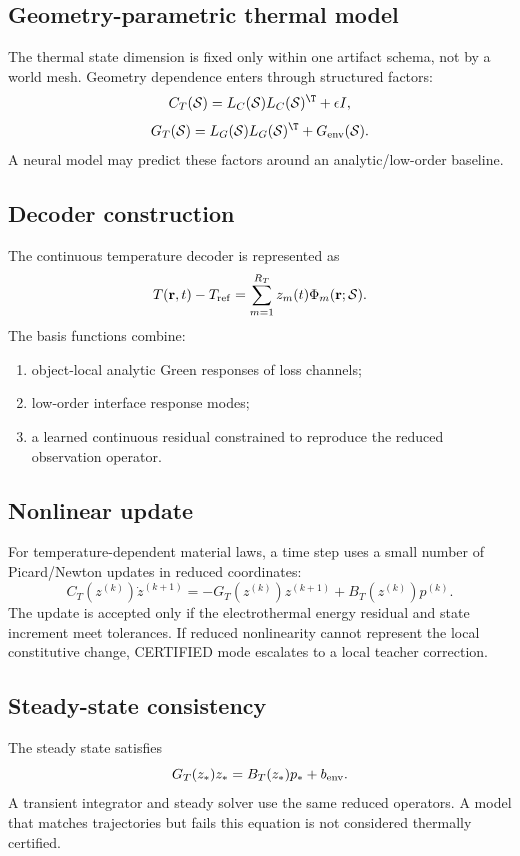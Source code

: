 \subsection{Geometry-parametric thermal model}

The thermal state dimension is fixed only within one artifact schema, not by a
world mesh. Geometry dependence enters through structured factors:
\[
 C_T(\mathcal S)=L_C(\mathcal S)L_C(\mathcal S)^\T+\epsilon I,
\]
\[
 G_T(\mathcal S)=L_G(\mathcal S)L_G(\mathcal S)^\T+G_{\rm env}(\mathcal S).
\]
A neural model may predict these factors around an analytic/low-order baseline.

\subsection{Decoder construction}

The continuous temperature decoder is represented as
\[
 T(\mathbf r,t)-T_{\rm ref}
 =
 \sum_{m=1}^{R_T}z_m(t)\Phi_m(\mathbf r;\mathcal S).
\]
The basis functions combine:
\begin{enumerate}
\item object-local analytic Green responses of loss channels;
\item low-order interface response modes;
\item a learned continuous residual constrained to reproduce the reduced
      observation operator.
\end{enumerate}

\subsection{Nonlinear update}

For temperature-dependent material laws, a time step uses a small number of
Picard/Newton updates in reduced coordinates:
\[
 C_T(z^{(k)})\dot z^{(k+1)}
 =
 -G_T(z^{(k)})z^{(k+1)}
 +B_T(z^{(k)})p^{(k)}.
\]
The update is accepted only if the electrothermal energy residual and state
increment meet tolerances. If reduced nonlinearity cannot represent the local
constitutive change, CERTIFIED mode escalates to a local teacher correction.

\subsection{Steady-state consistency}

The steady state satisfies
\[
 G_T(z_\ast)z_\ast
 =
 B_T(z_\ast)p_\ast+b_{\rm env}.
\]
A transient integrator and steady solver use the same reduced operators. A model
that matches trajectories but fails this equation is not considered thermally
certified.

